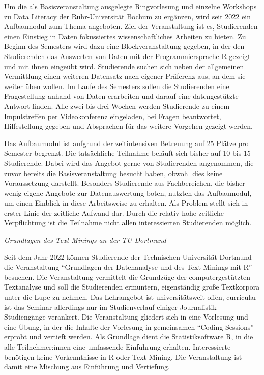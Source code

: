 \documentclass[
  letterpaper,
  DIV=11]{scrartcl}
\begin{document}
Um die als Basisveranstaltung ausgelegte Ringvorlesung und einzelne
Workshops zu Data Literacy der Ruhr-Universität Bochum zu ergänzen, wird
seit 2022 ein Aufbaumodul zum Thema angeboten. Ziel der Veranstaltung
ist es, Studierenden einen Einstieg in Daten fokussiertes
wissenschaftliches Arbeiten zu bieten. Zu Beginn des Semesters wird dazu
eine Blockveranstaltung gegeben, in der den Studierenden das Auswerten
von Daten mit der Programmiersprache R gezeigt und mit ihnen eingeübt
wird. Studierende suchen sich neben der allgemeinen Vermittlung einen
weiteren Datensatz nach eigener Präferenz aus, an dem sie weiter üben
wollen. Im Laufe des Semesters sollen die Studierenden eine
Fragestellung anhand von Daten erarbeiten und darauf eine datengestützte
Antwort finden. Alle zwei bis drei Wochen werden Studierende zu einem
Impulstreffen per Videokonferenz eingeladen, bei Fragen beantwortet,
Hilfestellung gegeben und Absprachen für das weitere Vorgehen gezeigt
werden.

Das Aufbaumodul ist aufgrund der zeitintensiven Betreuung auf 25 Plätze
pro Semester begrenzt. Die tatsächliche Teilnahme beläuft sich bisher
auf 10 bis 15 Studierende. Dabei wird das Angebot gerne von Studierenden
angenommen, die zuvor bereits die Basisveranstaltung besucht haben,
obwohl dies keine Voraussetzung darstellt. Besonders Studierende aus
Fachbereichen, die bisher wenig eigene Angebote zur Datenauswertung
boten, nutzten das Aufbaumodul, um einen Einblick in diese Arbeitsweise
zu erhalten. Als Problem stellt sich in erster Linie der zeitliche
Aufwand dar. Durch die relativ hohe zeitliche Verpflichtung ist die
Teilnahme nicht allen interessierten Studierenden möglich.

\emph{Grundlagen des Text-Minings an der TU Dortmund}

Seit dem Jahr 2022 können Studierende der Technischen Universität
Dortmund die Veranstaltung ``Grundlagen der Datenanalyse und des
Text-Minings mit R'' besuchen. Die Veranstaltung vermittelt die
Grundzüge der computergestützten Textanalyse und soll die Studierenden
ermuntern, eigenständig große Textkorpora unter die Lupe zu nehmen. Das
Lehrangebot ist universitätsweit offen, curricular ist das Seminar
allerdings nur im Studienverlauf einiger Journalistik-Studiengänge
verankert. Die Veranstaltung gliedert sich in eine Vorlesung und eine
Übung, in der die Inhalte der Vorlesung in gemeinsamen
``Coding-Sessions'' erprobt und vertieft werden. Als Grundlage dient die
Statistiksoftware R, in die alle Teilnehmer:innen eine umfassende
Einführung erhalten. Interessierte benötigen keine Vorkenntnisse in R
oder Text-Mining. Die Veranstaltung ist damit eine Mischung aus
Einführung und Vertiefung.
\end{document}
